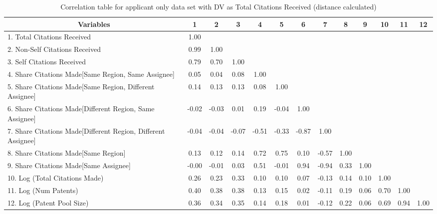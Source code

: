 \begin{table}[htbp]\centering \caption{Correlation table for applicant only data set with DV as Total Citations Received (distance calculated)\label{a.tcorrelation}}
\scriptsize
\singlespacing
\begin{adjustbox}{angle=90}
\begin{tabular}{l  c  c  c  c  c  c  c  c  c  c  c  c }\hline\hline
\multicolumn{1}{c}{Variables} &1&2&3&4&5&6&7&8&9&10&11&12\\ \hline
1. Total Citations Received&1.00\\
2. Non-Self Citations Received&0.99&1.00\\
3. Self Citations Received&0.79&0.70&1.00\\
4. Share Citations Made[Same Region, Same Assignee]&0.05&0.04&0.08&1.00\\
5. Share Citations Made[Same Region, Different Assignee]&0.14&0.13&0.13&0.08&1.00\\
6. Share Citations Made[Different Region, Same Assignee]&-0.02&-0.03&0.01&0.19&-0.04&1.00\\
7. Share Citations Made[Different Region, Different Assignee]&-0.04&-0.04&-0.07&-0.51&-0.33&-0.87&1.00\\
8. Share Citations Made[Same Region]&0.13&0.12&0.14&0.72&0.75&0.10&-0.57&1.00\\
9. Share Citations Made[Same Assignee]&-0.00&-0.01&0.03&0.51&-0.01&0.94&-0.94&0.33&1.00\\
10. Log (Total Citations Made)&0.26&0.23&0.33&0.10&0.10&0.07&-0.13&0.14&0.10&1.00\\
11. Log (Num Patents)&0.40&0.38&0.38&0.13&0.15&0.02&-0.11&0.19&0.06&0.70&1.00\\
12. Log (Patent Pool Size)&0.36&0.34&0.35&0.14&0.18&0.01&-0.12&0.22&0.06&0.69&0.94&1.00\\
\hline \hline 
 \end{tabular}
 \end{adjustbox}
\end{table}
